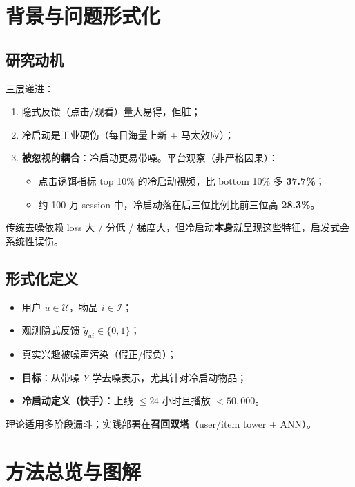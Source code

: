 \documentclass[11pt,a4paper]{ctexart}
\begin{document}
\section{背景与问题形式化}

\subsection{研究动机}
三层递进：
\begin{enumerate}
  \item 隐式反馈（点击/观看）量大易得，但脏；
  \item 冷启动是工业硬伤（每日海量上新 + 马太效应）；
  \item \textbf{被忽视的耦合}：冷启动更易带噪。平台观察（非严格因果）：
  \begin{itemize}
    \item 点击诱饵指标 top 10\% 的冷启动视频，比 bottom 10\% 多 \textbf{37.7\%}；
    \item 约 100 万 session 中，冷启动落在后三位比例比前三位高 \textbf{28.3\%}。
  \end{itemize}
\end{enumerate}

传统去噪依赖 loss 大 / 分低 / 梯度大，但冷启动\textbf{本身}就呈现这些特征，启发式会系统性误伤。

\subsection{形式化定义}
\begin{itemize}
  \item 用户 $u\in\mathcal{U}$，物品 $i\in\mathcal{I}$；
  \item 观测隐式反馈 $\tilde{y}_{ui}\in\{0,1\}$；
  \item 真实兴趣被噪声污染（假正/假负）；
  \item \textbf{目标}：从带噪 $\tilde{Y}$ 学去噪表示，尤其针对冷启动物品；
  \item \textbf{冷启动定义（快手）}：上线 $\le 24$ 小时且播放 $<50{,}000$。
\end{itemize}
理论适用多阶段漏斗；实践部署在\textbf{召回双塔}（user/item tower + ANN）。

\section{方法总览与图解}
\end{document}
